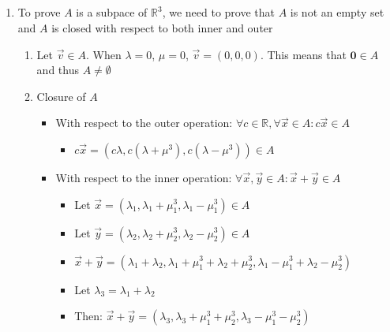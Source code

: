 \documentclass[12pt]{article}
\begin{document}
        \subsection{}
            \begin{enumerate}[label=(\alph*)]
                \item To prove $A$ is a subpace of $\mathbb{R}^3$, we need to prove that $A$ is not an empty set and $A$ is closed with respect to both inner and outer
                    \begin{enumerate}[label=\arabic*.]
                        \item Let $\vec{v}\in A$. When $\lambda = 0$, $\mu = 0$, $\vec{v} = (0, 0, 0)$. This means that $\textbf{0}\in A$ and thus $A \neq \emptyset$
                        \item Closure of $A$
                            \begin{itemize}
                                \item With respect to the outer operation: 
                                    $\forall c\in \mathbb{R}, \forall\vec{x}\in A: c\vec{x}\in A$
                                    \begin{itemize}
                                        \item $c\vec{x} = (c\lambda, c(\lambda + \mu^3), c(\lambda - \mu^3))\in A$
                                    \end{itemize} 
                                \item With respect to the inner operation: $\forall \vec{x}, \vec{y} \in A : \vec{x} + \vec{y} \in A$
                                    \begin{itemize}
                                        \item Let $\vec{x} = (\lambda_1, \lambda_1 + \mu_1^3, \lambda_1 - \mu_1^3)\in A$
                                        \item Let $\vec{y} = (\lambda_2, \lambda_2 + \mu_2^3, \lambda_2 - \mu_2^3)\in A$
                                        \item $\vec{x} + \vec{y} = (\lambda_1 + \lambda_2, \lambda_1 + \mu_1^3 + \lambda_2 + \mu_2^3, \lambda_1 - \mu_1^3 + \lambda_2 - \mu_2^3)$
                                        \item Let $\lambda_3 = \lambda_1 + \lambda_2$
                                        \item Then: $\vec{x} + \vec{y} = (\lambda_3, \lambda_3 + \mu_1^3 + \mu_2^3, \lambda_3 - \mu_1^3 - \mu_2^3)$

\end{itemize}
\end{itemize}
\end{enumerate}
\end{enumerate}
\end{document}

